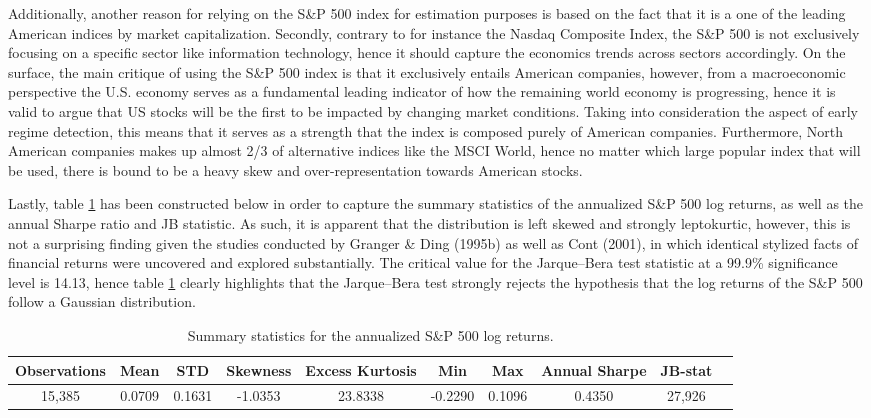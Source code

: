 Additionally, another reason for relying on the S\&P 500 index for estimation purposes is based on the fact that it is a one of the leading American indices by market capitalization. Secondly, contrary to for instance the Nasdaq Composite Index, the S\&P 500 is not exclusively focusing on a specific sector like information technology, hence it should capture the economics trends across sectors accordingly. On the surface, the main critique of using the S\&P 500 index is that it exclusively entails American companies, however, from a macroeconomic perspective the U.S. economy serves as a fundamental leading indicator of how the remaining world economy is progressing, hence it is valid to argue that US stocks will be the first to be impacted by changing market conditions. Taking into consideration the aspect of early regime detection, this means that it serves as a strength that the index is composed purely of American companies. Furthermore, North American companies makes up almost 2/3 of alternative indices like the MSCI World, hence no matter which large popular index that will be used, there is bound to be a heavy skew and over-representation towards American stocks.

Lastly, table \ref{tab:summary_stats_S&P500} has been constructed below in order to capture the summary statistics of the annualized S\&P 500 log returns, as well as the annual Sharpe ratio and JB statistic. As such, it is apparent that the distribution is left skewed and strongly leptokurtic, however, this is not a surprising finding given the studies conducted by Granger \& Ding (1995b) as well as Cont (2001), in which identical stylized facts of financial returns were uncovered and explored substantially. The critical value for the Jarque–Bera test statistic at a 99.9\% significance level is 14.13, hence table \ref{tab:summary_stats_S&P500} clearly highlights that the Jarque–Bera test strongly rejects the hypothesis that the log returns of the S\&P 500 follow a Gaussian distribution.

\begin{table}[H]
\small
\caption{Summary statistics for the annualized S\&P 500 log returns.}
\centering
\begin{tabular}{c c c c c c c c c c} 
\hline\hline
Observations & Mean & STD & Skewness & Excess Kurtosis & Min & Max & Annual Sharpe & JB-stat \\
\hline
15,385 & 0.0709 & 0.1631 & -1.0353 & 23.8338 & -0.2290 & 0.1096 & 0.4350 & 27,926 \\
\hline
\end{tabular}
\label{tab:summary_stats_S&P500}
\end{table}
 
